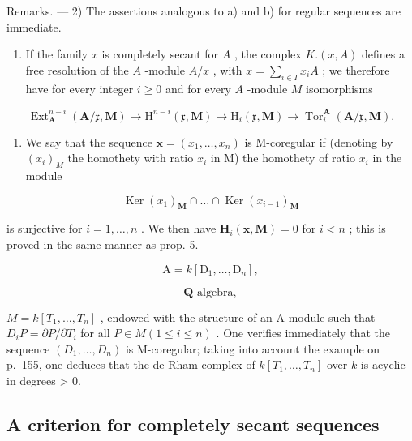 Remarks. --- 2) The assertions analogous to a) and b) for regular sequences are immediate.

\begin{enumerate}
\def\labelenumi{\arabic{enumi})}
\setcounter{enumi}{2}
\tightlist
\item
  If the family \(x\) is completely secant for \(A\) , the complex \(K.(x, A)\) defines a free resolution of the \(A\) -module \(A/x\) , with \(x = \sum_{i \in I} x_i A\) ; we therefore have for every integer \(i \geqslant 0\) and for every \(A\) -module \(M\) isomorphisms
\end{enumerate}

\[
\operatorname{Ext} _ {\mathbf {A}} ^ {n - i} (\mathbf {A} / \mathfrak {x}, \mathbf {M}) \rightarrow \mathrm{H} ^ {n - i} (\mathfrak {x}, \mathbf {M}) \rightarrow \mathrm{H} _ {i} (\mathfrak {x}, \mathbf {M}) \rightarrow \operatorname{Tor} _ {i} ^ {\mathbf {A}} (\mathbf {A} / \mathfrak {x}, \mathbf {M}).\tag{15}
\]

\begin{enumerate}
\def\labelenumi{\arabic{enumi})}
\setcounter{enumi}{3}
\tightlist
\item
  We say that the sequence \(\boldsymbol{x} = (x_1, \dots, x_n)\) is M-coregular if (denoting by \((x_i)_M\) the homothety with ratio \(x_i\) in M) the homothety of ratio \(x_i\) in the module
\end{enumerate}

\[
\operatorname{Ker} \left(x _ {1}\right) _ {\mathbf {M}} \cap \dots \cap \operatorname{Ker} \left(x _ {i - 1}\right) _ {\mathbf {M}}
\]

is surjective for \(i = 1, \ldots, n\) . We then have \(\mathbf{H}_{i}(\mathbf{x}, \mathbf{M}) = 0\) for \(i < n\) ; this is proved in the same manner as prop. 5.

\[
\mathrm{A} = k \left[ \mathrm{D} _ {1}, \dots , \mathrm{D} _ {n} \right],
\]

\[
\mathbf {Q} \text {-algebra},
\]

\(M = k[T_1, \ldots, T_n]\) , endowed with the structure of an A-module such that \(D_i P = \partial P / \partial T_i\) for all \(P \in M (1 \leqslant i \leqslant n)\) . One verifies immediately that the sequence \((D_1, \ldots, D_n)\) is M-coregular; taking into account the example on p.~155, one deduces that the de Rham complex of \(k[T_1, \ldots, T_n]\) over \(k\) is acyclic in degrees \textgreater{} 0.

\subsection{A criterion for completely secant sequences}

